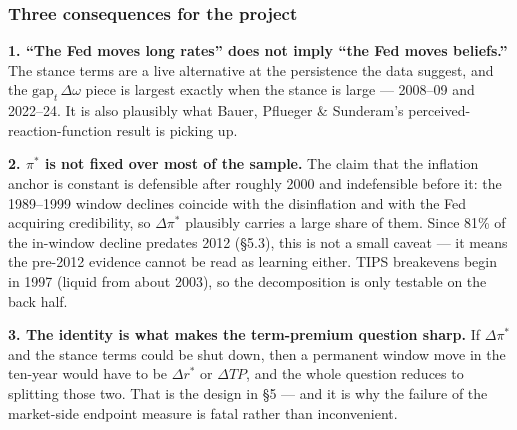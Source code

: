 \subsubsection*{Three consequences for the project}

\textbf{1. ``The Fed moves long rates'' does not imply ``the Fed moves \rs{} beliefs.''} The
stance terms are a live alternative at the persistence the data suggest, and the
$\text{gap}_t\,\Delta\omega$ piece is largest exactly when the stance is large --- 2008--09 and
2022--24. It is also plausibly what Bauer, Pflueger \& Sunderam's perceived-reaction-function
result is picking up.

\textbf{2. $\pi^{*}$ is not fixed over most of the sample.} The claim that the inflation
anchor is constant is defensible after roughly 2000 and indefensible before it: the 1989--1999
window declines coincide with the disinflation and with the Fed acquiring credibility, so
$\Delta\pi^{*}$ plausibly carries a large share of them. Since 81\% of the in-window decline
predates 2012 (\S5.3), this is not a small caveat --- it means the pre-2012 evidence cannot
be read as \rs{} learning either. TIPS breakevens begin in 1997 (liquid from about 2003), so
the decomposition is only testable on the back half.

\textbf{3. The identity is what makes the term-premium question sharp.} If $\Delta\pi^{*}$ and
the stance terms could be shut down, then a permanent window move in the ten-year would have
to be $\Delta r^{*}$ or $\Delta TP$, and the whole question reduces to splitting those two.
That is the design in \S5 --- and it is why the failure of the market-side endpoint measure
is fatal rather than inconvenient.
